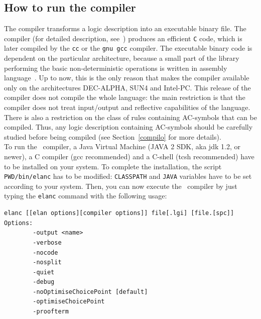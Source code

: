 \subsection{How to run the \elan{} compiler}
\label{how_to_compile}
The \elan{} compiler transforms a logic description into an executable
binary file.  The compiler (for detailed description,
see~\cite{Vittek-RTA96,MoreauK-PLILP+ALP98}) produces an efficient
\verb|C| code, which is later compiled by the \verb|cc| or the
\verb|gnu gcc| compiler. 
The executable binary code is dependent on the particular
architecture, because a small part of the \elan{} library performing
the basic non-deterministic operations is written in assembly
language~\cite{Moreau-JICSLPW98}.
Up to now, this is the only reason that makes
the compiler available only on the architectures DEC-ALPHA, SUN4 and
Intel-PC.  This release of the \elan{} compiler does not compile the
whole \elan{} language: the main restriction is that the \elan{}
compiler does not treat input/output and reflective capabilities of
the \elan{} language. There is also a restriction on the class of rules
containing AC-symbols that can be compiled.
Thus, any logic description containing AC-symbols should be carefully
studied before being compiled (see Section~\ref{compilo} for more
details).\\


\noindent To run the \elan\ compiler, a Java Virtual Machine (JAVA 2 SDK, aka
jdk 1.2, or newer), a C compiler (gcc recommended) and a C-shell (tcsh
recommended) have to be installed on your system. 
To complete the installation, the script {\tt PWD/bin/elanc} has to be
modified: {\tt CLASSPATH} and {\tt JAVA} variables have to be set according to
your system. 
Then, you can now execute the \elan\ compiler by just typing the \verb|elanc|
command with the following usage: 
{\footnotesize\begin{verbatim}
elanc [[elan options][compiler options]] file[.lgi] [file.[spc]]
Options:
        -output <name>
        -verbose
        -nocode
        -nosplit
        -quiet
        -debug
        -noOptimiseChoicePoint [default]
        -optimiseChoicePoint
        -proofterm
\end{verbatim}
}

